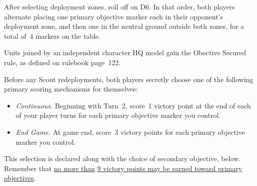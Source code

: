

\begin{tablesetup}

  \dawnofwar

  \bigskip%
  After selecting deployment zones, roll off on D6.  In that order,
  both players alternate placing one primary objective marker each in
  their opponent's deployment zone, and then one in the neutral ground
  outside both zones, for a total of~4 markers on the table.

\end{tablesetup}

\begin{missionrules}

   Units joined by an independent
  character HQ model gain the Obective Secured rule, as defined on
  rulebook page~122.

\end{missionrules}


\begin{scoring}
  
\begin{primaries}

  Before any Scout redeployments, both players secretly choose one of
  the following primary scoring mechanisms for themselves:

  \begin{itemize}
  \item {\textit{Continuous.}} Beginning with Turn~2, score~1 victory
    point at the end of each of your player turns for each primary
    objective marker you control.

  \item {\textit{End Game.}} At game end, score~3 victory points for
    each primary objective marker you control.

  \end{itemize}
  This selection is declared along with the choice of secondary
  objective, below.  Remember that \underline{no more than}
  \underline{9 victory points may be earned toward primary
    objectives}.

\end{primaries}

\begin{secondaries}
  \overrun

  \assassination

  \meatgrinder

  \seizeground
\end{secondaries}

\end{scoring}
